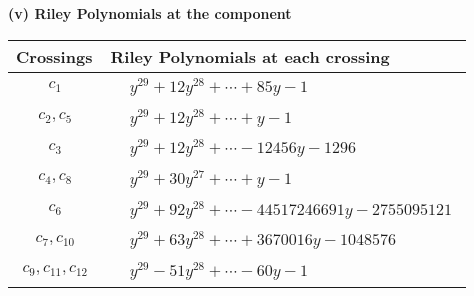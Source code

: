 \documentclass[1p]{elsarticle_modified}
\theoremstyle{definition}
\begin{document}
\flushleft \textbf{(v) Riley Polynomials at the component}\newline \\
\begin{tabular}{m{50pt}|m{274pt}}
Crossings & \hspace{64pt}Riley Polynomials at each crossing \\
\hline $$\begin{aligned}c_{1}\end{aligned}$$&$\begin{aligned}
&y^{29}+12 y^{28}+\cdots+85 y-1
\end{aligned}$\\
\hline $$\begin{aligned}c_{2},c_{5}\end{aligned}$$&$\begin{aligned}
&y^{29}+12 y^{28}+\cdots+y-1
\end{aligned}$\\
\hline $$\begin{aligned}c_{3}\end{aligned}$$&$\begin{aligned}
&y^{29}+12 y^{28}+\cdots-12456 y-1296
\end{aligned}$\\
\hline $$\begin{aligned}c_{4},c_{8}\end{aligned}$$&$\begin{aligned}
&y^{29}+30 y^{27}+\cdots+y-1
\end{aligned}$\\
\hline $$\begin{aligned}c_{6}\end{aligned}$$&$\begin{aligned}
&y^{29}+92 y^{28}+\cdots-44517246691 y-2755095121
\end{aligned}$\\
\hline $$\begin{aligned}c_{7},c_{10}\end{aligned}$$&$\begin{aligned}
&y^{29}+63 y^{28}+\cdots+3670016 y-1048576
\end{aligned}$\\
\hline $$\begin{aligned}c_{9},c_{11},c_{12}\end{aligned}$$&$\begin{aligned}
&y^{29}-51 y^{28}+\cdots-60 y-1
\end{aligned}$\\
\hline
\end{tabular}\\~\\
\end{document}
